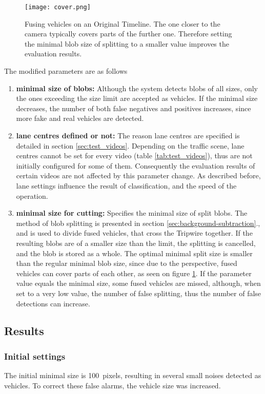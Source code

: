 \begin{figure}[h]
	\centering
	\texttt{[image: cover.png]}
	\caption{Fusing vehicles on an Original Timeline. The one closer to the camera typically covers parts of the further one. Therefore setting the minimal blob size of splitting to a smaller value improves the evaluation results.\label{fig:cover}}
\end{figure}

\noindent The modified parameters are as follows
\begin{enumerate}
	\item \textbf{minimal size of blobs:} Although the system detects blobs of all sizes, only the ones exceeding the size limit are accepted as vehicles. If the minimal size decreases, the number of both false negatives and positives increases, since more fake and real vehicles are detected.
	
	\item \textbf{lane centres defined or not:} The reason lane centres are specified is detailed in section \ref{sec:test_videos}. Depending on the traffic scene, lane centres cannot be set for every video (table \ref{tab:test_videos}), thus are not initially configured for some of them. Consequently the evaluation results of certain videos are not affected by this parameter change. As described before, lane settings influence the result of classification, and the speed of the operation.
	
	\item \textbf{minimal size for cutting:} Specifies the minimal size of split blobs. The method of blob splitting is presented in section \ref{sec:background-subtraction}., and is used to divide fused vehicles, that cross the Tripwire together. If the resulting blobs are of a smaller size than the limit, the splitting is cancelled, and the blob is stored as a whole. The optimal minimal split size is smaller than the regular minimal blob size, since due to the perspective, fused vehicles can cover parts of each other, as seen on figure \ref{fig:cover}. If the parameter value equals the minimal size, some fused vehicles are missed, although, when set to a very low value, the number of false splitting, thus the number of false detections can increase.
\end{enumerate}

\subsection{Results}
\subsubsection{Initial settings}
The initial minimal size is \SI{100}{pixels}, resulting in several small noises detected as vehicles.
To correct these false alarms, the vehicle size was increased.

